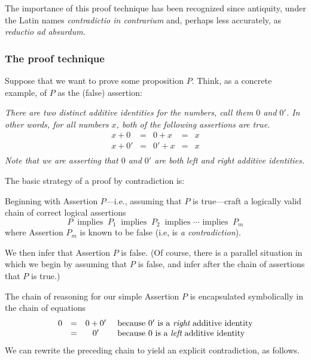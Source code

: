 The importance of this proof technique has been recognized since antiquity, under the Latin names {\em contradictio in contrarium} and, perhaps less accurately,  as {\em reductio ad absurdum}.

\subsubsection{The proof technique}
\label{sec:contradiction-technique}

Suppose that we want to prove some proposition $P$.  Think, as a concrete example, of $P$ as the (false) assertion:

\medskip

{\em There are two distinct {\em additive identities} for the numbers, call them $0$ and $0'$.  In other words, for all numbers $x$, both of the following assertions are true.}
\[ \begin{array}{ccccc}
x + 0 & = & 0 + x & = & x \\
x + 0' & = & 0' + x & = & x \\
\end{array}
\]
{\em Note that we are asserting that $0$ and $0'$ are both left and right additive identities.}

\medskip

\noindent
The basic strategy of a proof by contradiction is:

Beginning with Assertion $P$---i.e., assuming that $P$ is true---craft a logically valid chain of correct logical assertions
\[ P \ \mbox{ implies } \ P_1  \ \mbox{ implies } \ P_2  \ 
\mbox{ implies } \cdots \mbox{ implies } \ P_m
\]
where Assertion $P_m$ is known to be false (i.e, is {\it a contradiction}).

\medskip

\noindent
We then infer that Assertion $P$ is false.  (Of course, there is a parallel situation in which we begin by assuming that $P$ is false, and infer after the chain of assertions that $P$ is true.)

\smallskip

The chain of reasoning for our simple Assertion $P$ is encapsulated symbolically in the chain of equations
\[
\begin{array}{cccl}
 0 & = & 0 + 0' & \mbox{ because $0'$ is a {\em right} additive identity} \\
   & = & 0' & \mbox{ because $0$ is a {\em left} additive identity}
\end{array}
\]
We can rewrite the preceding chain to yield an explicit contradiction, as follows.

